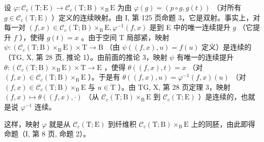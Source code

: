设 \(\varphi\colon\mathcal{C}_{c}(\mathrm{T};\mathrm{E})\to\mathcal{C}_{c}(\mathrm{T};\mathrm{B})\times_{\mathrm{B}}\mathrm{E}\) 为由 \(\varphi(g)=(p\circ g,g(t))\) （对所有 \(g\in\mathcal{C}_{c}(\mathrm{T};\mathrm{E})\) ）定义的连续映射。由 I, 第 125 页命题 3，它是双射。事实上，对每一对 \((f,x)\in\mathcal{C}_{c}(\mathrm{T};\mathrm{B})\times_{\mathrm{B}}\mathrm{E},\varphi^{-1}(f,x)\) 是到 E 中的唯一连续提升 \(g\) （它提升 \(f\) ），使得 \(g(t)=x\) 。由于空间 T 局部紧，映射 \(\psi\colon(\mathcal{C}_{c}(\mathrm{T};\mathrm{B})\times_{\mathrm{B}}\mathrm{E})\times\mathrm{T}\to\mathrm{B}\) （由 \(\psi((f,x),u)=f(u)\) 定义）是连续的（TG, X, 第 28 页, 推论 1）。由前面的推论 3，映射 \(\psi\) 有唯一的连续提升 \(\theta\colon(\mathcal{C}_{c}(\mathrm{T};\mathrm{B})\times_{\mathrm{B}}\mathrm{E})\times\mathrm{T}\to\mathrm{E}\) ，使得 \(\theta((f,x),t)=x\) （对 \((f,x)\in\mathcal{C}_{c}(\mathrm{T};\mathrm{B})\times_{\mathrm{B}}\mathrm{E}\) ）。于是有 \(\theta((f,x),u)=\varphi^{-1}(f,x)(u)\) （对 \((f,x)\in\mathcal{C}_{c}(\mathrm{T};\mathrm{B})\times_{\mathrm{B}}\mathrm{E}\) 与 \(u\in\mathrm{T}\) ）。由 TG, X, 第 28 页定理 3，映射 \((f,x)\mapsto\theta((f,x),\cdot)\) （从 \(\mathcal{C}_{c}(\mathrm{T};\mathrm{B})\times_{\mathrm{B}}\mathrm{E}\) 到 \(\mathcal{C}_{c}(\mathrm{T};\mathrm{E})\) ）是连续的，也就是说 \(\varphi^{-1}\) 连续。

这样，映射 \(\varphi\) 就是从 \(\mathcal{C}_c(\mathrm{T};\mathrm{E})\) 到纤维积 \(\mathcal{C}_c(\mathrm{T};\mathrm{B})\times_{\mathrm{B}}\mathrm{E}\) 上的同胚，由此即得命题（I, 第 8 页, 命题 2）。

